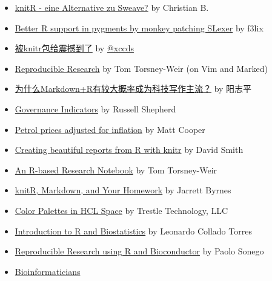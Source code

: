 \documentclass[
  lualatex,ja=standard,jafont=noto-otf]{bxjsreport}
\begin{document}
\begin{itemize}
{  literate programming with R} by Christophe Lalanne
\item
  \href{http://www.blogofolio.de/2012/05/knitr-eine-alternative-zu-sweave/}{knitR
  - eine Alternative zu Sweave?} by Christian B.
\item
  \href{http://blog.felixriedel.com/2012/05/better-r-support-in-pygments-by-monkey-patching-slexer/}{Better
  R support in pygments by monkey patching SLexer} by f3lix
\item
  \href{http://xccds1977.blogspot.com/2012/05/knitr.html}{被knitr包给震撼到了}
  by \href{https://twitter.com/xccds}{@xccds}
\item
  \href{http://torsneyt.wordpress.com/2012/05/19/reproducible-research/}{Reproducible
  Research} by Tom Torsney-Weir (on Vim and Marked)
\item
  \href{http://www.yangzhiping.com/tech/r-markdown-knitr.html}{为什么Markdown+R有较大概率成为科技写作主流？}
  by 阳志平
\item
  \href{http://www.russellshepherd.com/d/?q=blog/governance-indicators}{Governance
  Indicators} by Russell Shepherd
\item
  \href{http://mcfromnz.wordpress.com/2012/07/28/petrol-prices-adjusted-for-inflation/}{Petrol
  prices adjusted for inflation} by Matt Cooper
\item
  \href{http://blog.revolutionanalytics.com/2012/08/creating-beautiful-reports-from-r-with-knitr.html}{Creating
  beautiful reports from R with knitr} by David Smith
\item
  \href{http://www.tomtorsneyweir.com/research-notebook/}{An R-based
  Research Notebook} by Tom Torsney-Weir
\item
  \href{http://learningdata.wordpress.com/2012/09/30/knitr-markdown-and-your-homework/}{knitR,
  Markdown, and Your Homework} by Jarrett Byrnes
\item
  \href{http://www.trestletechnology.net/2012/10/color-palettes-in-hcl-space/}{Color
  Palettes in HCL Space} by Trestle Technology, LLC
\item
  \href{http://fellgernon.tumblr.com/post/35587597245/introduction-to-r-and-biostatistics-2012-version}{Introduction
  to R and Biostatistics} by Leonardo Collado Torres
\item
  \href{http://onertipaday.blogspot.com/2012/12/italian-bio-r-day-2012-slides-on.html}{Reproducible
  Research using R and Bioconductor} by Paolo Sonego
\item
  \href{http://reasoniamhere.com/bioinformaticians-need-lab-notebooks-too/}{Bioinformaticians
}
\end{itemize}
\end{document}
